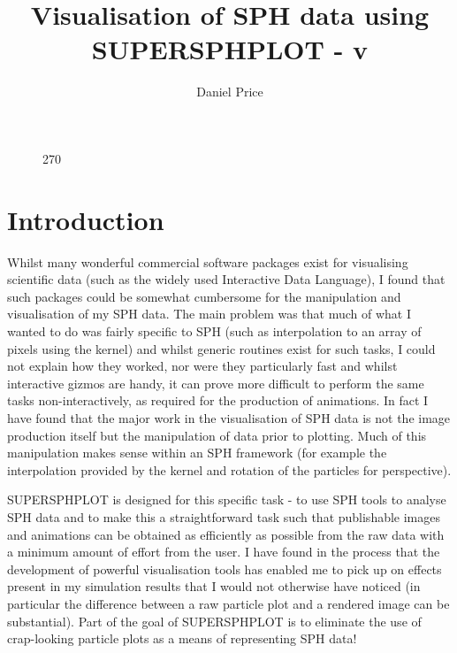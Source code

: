 \documentclass[a4paper,11pt]{article}
\title{Visualisation of SPH data using SUPERSPHPLOT - v}
\author{Daniel Price}
\begin{document}
\begin{figure}
\begin{center}
\begin{turn}{270}\end{turn}
\end{center}
\end{figure}
\maketitle
\tableofcontents
\newpage

\section{Introduction}
 Whilst many wonderful commercial software packages exist for visualising scientific
data (such as the widely used Interactive Data Language), I found that such packages
could be somewhat cumbersome for the manipulation and visualisation of my SPH data. The
main problem was that much of what I wanted to do was fairly specific to SPH (such as
interpolation to an array of pixels using the kernel) and whilst generic routines exist
for such tasks, I could not explain how they worked, nor were they
particularly fast and whilst interactive gizmos are handy, it can prove more difficult to perform the
same tasks non-interactively, as required for the production of animations. 
In fact I have found that the major
work in the visualisation of SPH data is not the image production itself but the
manipulation of data prior to plotting. Much of this manipulation makes sense
within an SPH framework (for example the interpolation provided by the kernel
and rotation of the particles for perspective).

 SUPERSPHPLOT is designed for this specific task - to use SPH tools to analyse SPH data and to make this a
straightforward task such that publishable images and animations can be obtained
as efficiently as possible from the raw data with a minimum amount of effort
from the user. I have found in the process that the development of powerful
visualisation tools has enabled me to pick up on effects present in my
simulation results that I would not otherwise have noticed (in particular the
difference between a raw particle plot and a rendered image can be substantial). Part of the goal of
SUPERSPHPLOT is to eliminate the use of crap-looking particle plots as a means of representing SPH data!
\end{document}
